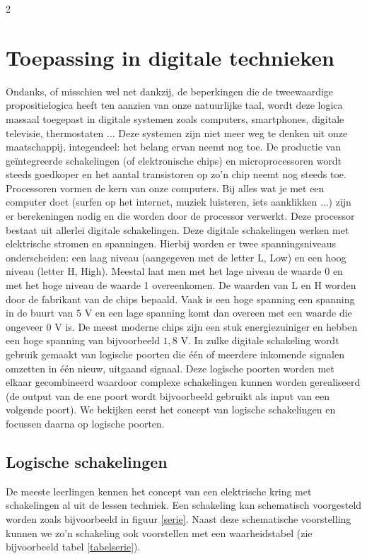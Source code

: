 \begin{multicols}{2}

\section{Toepassing in digitale technieken}

Ondanks, of misschien wel net dankzij, de beperkingen die de tweewaardige propositielogica heeft ten aanzien van onze natuurlijke taal, wordt deze logica massaal toegepast in digitale systemen zoals computers, smartphones, digitale televisie, thermostaten $\ldots$ Deze systemen zijn niet meer weg te denken uit onze maatschappij, integendeel: het belang ervan neemt nog toe. De productie van geïntegreerde schakelingen (of elektronische chips) en microprocessoren wordt steeds goedkoper en het aantal transistoren op zo'n chip neemt nog steeds toe. Processoren vormen de kern van onze computers. Bij alles wat je met een computer doet (surfen op het internet, muziek luisteren, iets aanklikken $\ldots$) zijn er berekeningen nodig en die worden door de processor verwerkt. Deze processor bestaat uit allerlei digitale schakelingen. Deze digitale schakelingen werken met elektrische stromen en spanningen. Hierbij worden er twee spanningsniveaus onderscheiden: een laag niveau (aangegeven met de letter L, Low) en een hoog niveau (letter H, High). Meestal laat men met het lage niveau de waarde 0 en met het hoge niveau de waarde 1 overeenkomen. De waarden van L en H worden door de fabrikant van de chips bepaald. Vaak is een hoge spanning een spanning in de buurt van $5$ V en een lage spanning komt dan overeen met een waarde die ongeveer $0$ V is. De meest moderne chips zijn een stuk energiezuiniger en hebben een hoge spanning van bijvoorbeeld $1,8$ V. In zulke digitale schakeling wordt gebruik gemaakt van logische poorten die één of meerdere inkomende signalen omzetten in één nieuw, uitgaand signaal. Deze logische poorten worden met elkaar gecombineerd waardoor complexe schakelingen kunnen worden gerealiseerd (de output van de ene poort wordt bijvoorbeeld gebruikt als input van een volgende poort). We bekijken eerst het concept van logische schakelingen en focussen daarna op logische poorten.


\subsection{Logische schakelingen}

De meeste leerlingen kennen het concept van een elektrische kring met schakelingen al uit de lessen techniek. Een schakeling kan schematisch voorgesteld worden zoals bijvoorbeeld in figuur \ref{serie}. Naast deze schematische voorstelling kunnen we zo'n schakeling ook voorstellen met een waarheidstabel (zie bijvoorbeeld tabel \ref{tabelserie}). 


\end{multicols}
